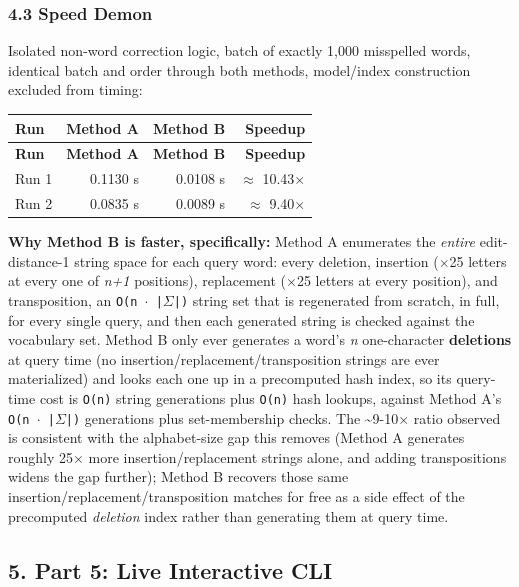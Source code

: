 \documentclass[11pt,a4paper]{article}
\begin{document}
\subsubsection*{4.3 Speed Demon}

Isolated non-word correction logic, batch of exactly 1,000 misspelled words, identical batch and order through both methods, model/index construction excluded from timing:

{\small
\setlength{\tabcolsep}{4pt}
\begin{longtable}{lrrr}
\toprule
\textbf{Run} & \textbf{Method A} & \textbf{Method B} & \textbf{Speedup} \\
\midrule
\endfirsthead
\toprule
\textbf{Run} & \textbf{Method A} & \textbf{Method B} & \textbf{Speedup} \\
\midrule
\endhead
Run 1 & 0.1130 s & 0.0108 s & $\approx$ 10.43$\times$ \\
Run 2 & 0.0835 s & 0.0089 s & $\approx$ 9.40$\times$ \\
\bottomrule
\end{longtable}}

\textbf{Why Method B is faster, specifically:} Method A enumerates the \textit{entire} edit-distance-1 string space for each query word: every deletion, insertion ($\times$25 letters at every one of \textit{n+1} positions), replacement ($\times$25 letters at every position), and transposition, an \texttt{O(n $\cdot$ |$\Sigma$|)} string set that is regenerated from scratch, in full, for every single query, and then each generated string is checked against the vocabulary set. Method B only ever generates a word's \textit{n} one-character \textbf{deletions} at query time (no insertion/replacement/transposition strings are ever materialized) and looks each one up in a precomputed hash index, so its query-time cost is \texttt{O(n)} string generations plus \texttt{O(n)} hash lookups, against Method A's \texttt{O(n $\cdot$ |$\Sigma$|)} generations plus set-membership checks. The \textasciitilde{}9-10$\times$ ratio observed is consistent with the alphabet-size gap this removes (Method A generates roughly 25$\times$ more insertion/replacement strings alone, and adding transpositions widens the gap further); Method B recovers those same insertion/replacement/transposition matches for free as a side effect of the precomputed \textit{deletion} index rather than generating them at query time.

\subsection*{5. Part 5: Live Interactive CLI}
\end{document}
